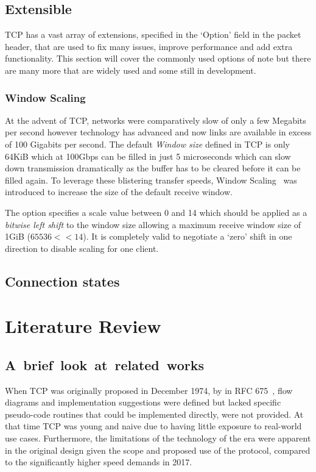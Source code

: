 \documentclass[11pt,a4paper,british]{bhamarticle}
\begin{document}
\begin{multicols}{2}
\subsection{Extensible}
TCP has a vast array of extensions, specified in the `Option' field in the packet header, that are used to fix many issues, improve performance and add extra functionality. This section will cover the commonly used options of note but there are many more that are widely used and some still in development.

\subsubsection{Window Scaling}
At the advent of TCP, networks were comparatively slow of only a few Megabits per second however technology has advanced and now links are available in excess of 100 Gigabits per second. The default \textit{Window size} defined in TCP is only 64KiB which at 100Gbps can be filled in just 5 microseconds which can slow down transmission dramatically as the buffer has to be cleared before it can be filled again. To leverage these blistering transfer speeds, Window Scaling~\cite[2]{rfc1323} was introduced to increase the size of the default receive window. 

The option specifies a scale value between 0 and 14 which should be applied as a \textit{bitwise left shift} to the window size allowing a maximum receive window size of 1GiB ($65536 << 14$). It is completely valid to negotiate a `zero' shift in one direction to disable scaling for one client.
\subsection{Connection states}

\section{Literature Review}
\subsection{\mbox{A brief look at related works}}
When TCP was originally proposed in December 1974, by \citeauthor{rfc675} in RFC 675~\cite{rfc675}, flow diagrams and implementation suggestions were defined but lacked specific pseudo-code routines that could be implemented directly, were not provided. At that time TCP was young and naive due to having little exposure to real-world use cases. Furthermore, the limitations of the technology of the era were apparent in the original design given the scope and proposed use of the protocol, compared to the significantly higher speed demands in 2017.


\end{multicols}
\end{document}
